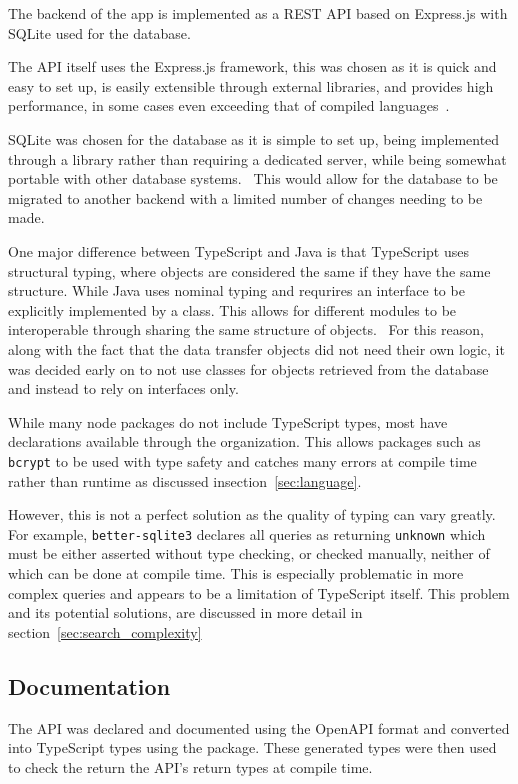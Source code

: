 The backend of the app is implemented as a REST API based on Express.js with SQLite
used for the database.

The API itself uses the Express.js framework, this was chosen as it is quick and easy to set up, is easily extensible
through external libraries, and provides high performance, in some cases even exceeding that of
compiled languages~\cite{karlsson_performance_2021}.

SQLite was chosen for the database as it is simple to set up, being implemented through
a library rather than requiring a dedicated server, while being somewhat portable with other
database systems.~\cite{kreibich_using_2010} This would allow for the database to be migrated to
another backend with a limited number of changes needing to be made.

One major difference between TypeScript and Java is that TypeScript uses structural typing, where objects are considered
the same if they have the same structure. While Java uses nominal typing and requrires an interface to be explicitly
implemented by a class. This allows for different modules to be interoperable through sharing the same structure of objects.~\cite{gil_whiteoak_2008}
For this reason, along with the fact that the data transfer objects did not need their own logic, it was decided early on
to not use classes for objects retrieved from the database and instead to rely on interfaces only.

While many node packages do not include TypeScript types, most have declarations available through the  organization.
This allows packages such as \texttt{bcrypt} to be used with type safety and catches many errors at compile time rather than runtime as discussed
insection~\ref{sec:language}.

However, this is not a perfect solution as the quality of typing can vary greatly. For example, \texttt{better-sqlite3}
declares all queries as returning \texttt{unknown} which must be either asserted without type checking, or checked manually, neither of which
can be done at compile time. This is especially problematic in more complex queries and appears to be a limitation of TypeScript itself. This
problem and its potential solutions, are discussed in more detail in section~\ref{sec:search_complexity}

\subsection{Documentation}
The API was declared and documented using the OpenAPI format and converted
into TypeScript types using the  package. These
generated types were then used to check the return the API's return types at compile time.

